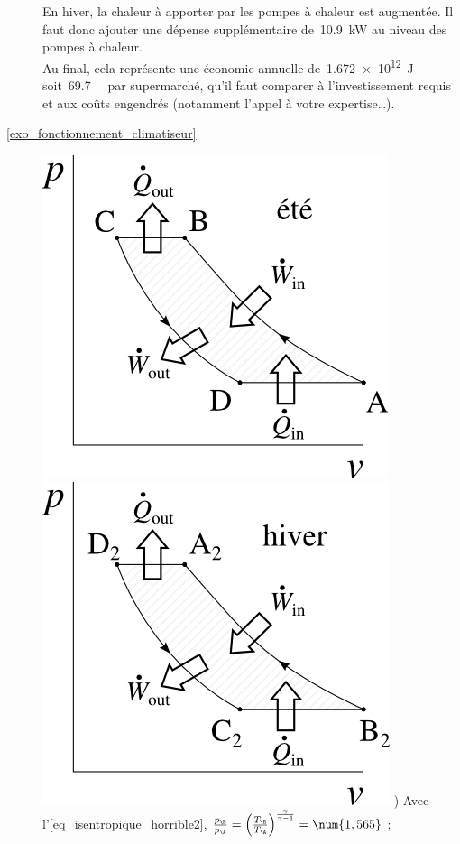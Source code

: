 \begin{description}
			En hiver, la chaleur à apporter par les pompes à chaleur est augmentée. Il faut donc ajouter une dépense supplémentaire de~\SI{10,9}{\kilo\watt} au niveau des pompes à chaleur.\\
			Au final, cela représente une économie annuelle de~\SI{1,672e12}{\joule} soit~\SI{69,7}{\kilo\euroo} par supermarché, qu’il faut comparer à l’investissement requis et aux coûts engendrés (notamment l’appel à votre expertise…).
	\item [\ref{exo_fonctionnement_climatiseur}]
				\includegraphics[height=\solutiondiagramwidth]{images/exo_sol_pv_climatiseur.png}
				\includegraphics[height=\solutiondiagramwidth]{images/exo_sol_pv_thermopompe.png}
				) Avec l’\cref{eq_isentropique_horrible2}, $\frac{p_\B }{p_\A} = \left(\frac{T_\B}{T_\A}\right)^{\frac{\gamma}{\gamma - 1}} = \num{1,565}$ ;

\end{description}
